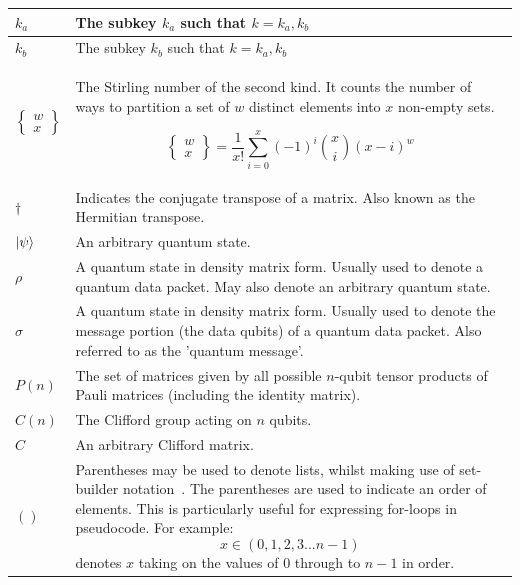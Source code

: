 \begin{xltabular}{\linewidth}{ l | X }
$k_a$ & The subkey $k_a$ such that $k = k_a,k_b$
\\ \hline

$k_b$ & The subkey $k_b$ such that $k = k_a,k_b$
\\ \hline

$\left\{\begin{smallmatrix}w\\x\end{smallmatrix}\right\}$ & The Stirling number of the second kind. It counts the number of ways to partition a set of $w$ distinct elements into $x$ non-empty sets.

\begin{equation}
\left\{\begin{smallmatrix}w\\x\end{smallmatrix}\right\} = \frac{1}{x !} \sum_{i=0}^{x}(-1)^{i}{x \choose i}(x-i)^{w}
\end{equation}
\\ \hline 

$\dagger$ & Indicates the conjugate transpose of a matrix. Also known as the Hermitian transpose.
\\ \hline

$\ket{\psi}$ & An arbitrary quantum state.
\\ \hline

$\rho$ & A quantum state in density matrix form. Usually used to denote a quantum data packet. May also denote an arbitrary quantum state.
\\ \hline

$\sigma$ & A quantum state in density matrix form. Usually used to denote the message portion (the data qubits) of a quantum data packet. Also referred to as the 'quantum message'.
\\ \hline

$P(n)$ & The set of matrices given by all possible $n$-qubit tensor products of Pauli matrices (including the identity matrix).
\\ \hline

$C(n)$ & The Clifford group acting on $n$ qubits.
\\ \hline

$C$ & An arbitrary Clifford matrix.
\\ \hline

$()$ & Parentheses may be used to denote lists, whilst making use of set-builder notation~\cite{setBuilderNotationWikipedia}. The parentheses are used to indicate an order of elements. This is particularly useful for expressing for-loops in pseudocode. For example:
$$x \in (0,1,2,3... n-1)$$
denotes $x$ taking on the values of $0$ through to $n-1$ in order.
\\ \hline


\end{xltabular}
